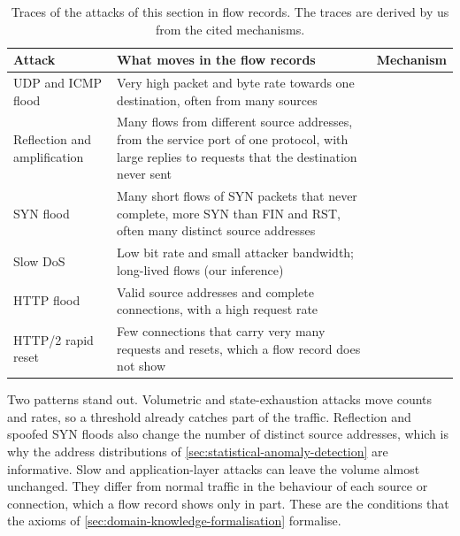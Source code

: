 \begin{table}[t]
\centering
\small
\caption{Traces of the attacks of this section in flow records. The traces
are derived by us from the cited mechanisms.}
\label{tab:ddos-flow-signatures}
\begin{tabular}{@{}p{2.8cm}p{6.5cm}p{2.9cm}@{}}
\toprule
Attack & What moves in the flow records & Mechanism \\
\midrule
UDP and ICMP flood & Very high packet and byte rate towards one destination,
  often from many sources
  & \citep{handley2006rfc4732,mirkovic2004taxonomy} \\
Reflection and amplification & Many flows from different source addresses,
  from the service port of one protocol, with large replies to requests that
  the destination never sent
  & \citep{rossow2014amplification} \\
SYN flood & Many short flows of SYN packets that never complete, more SYN than
  FIN and RST, often many distinct source addresses
  & \citep{eddy2007rfc4987,wang2002detecting} \\
Slow DoS & Low bit rate and small attacker bandwidth; long-lived flows (our inference)
  & \citep{cambiaso2013slow} \\
HTTP flood & Valid source addresses and complete connections, with a high
  request rate
  & \citep{mirkovic2004taxonomy} \\
HTTP/2 rapid reset & Few connections that carry very many requests and
  resets, which a flow record does not show
  & \citep{thomson2022rfc9113,nvd2023rapidreset} \\
\bottomrule
\end{tabular}
\end{table}

Two patterns stand out. Volumetric and state-exhaustion attacks move counts
and rates, so a threshold already catches part of the traffic. Reflection and
spoofed SYN floods also change the number of distinct source addresses, which
is why the address distributions of \cref{sec:statistical-anomaly-detection}
are informative. Slow and application-layer attacks can leave the volume
almost unchanged. They differ from normal traffic in the behaviour of each
source or connection, which a flow record shows only in part. These are the
conditions that the axioms of \cref{sec:domain-knowledge-formalisation}
formalise.

